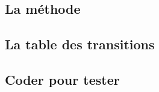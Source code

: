 \subsection{La méthode}

	


\subsection{La table des transitions}

	


\subsection{Coder pour tester}

	
